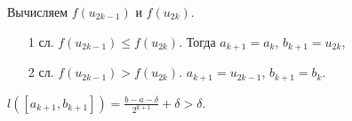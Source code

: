 Вычисляем $ f(u_{2k-1}) $ и $ f(u_{2k}) $.
\begin{enumerate}
  \item[1 сл.] $ f(u_{2k-1}) \leqslant f(u_{2k}) $. Тогда $ a_{k+1} = a_k $, $ b_{k+1} = u_{2k} $,
  \item[2 сл.] $ f(u_{2k-1}) > f(u_{2k}) $. $ a_{k+1} = u_{2k-1} $, $ b_{k+1} = b_k $.
\end{enumerate}
$ l([a_{k+1}, b_{k+1}]) = \frac{b-a -\delta}{2^{k+1}} + \delta > \delta$.

